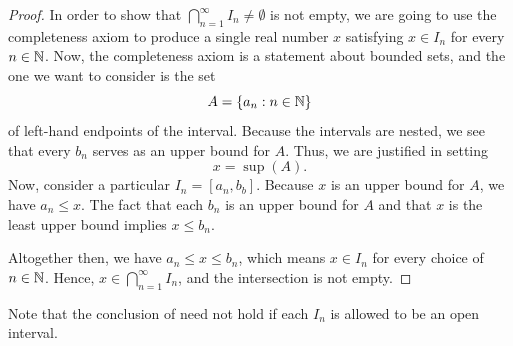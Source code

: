 \begin{proof}
  In order to show that $\bigcap_{n = 1}^{\infty} I_n \neq \emptyset$
  is not empty, we are going to use the completeness axiom to produce
  a single real number $x$ satisfying $x \in I_n$ for every $n \in
  \mathbb N$. Now, the completeness axiom is a statement about bounded
  sets, and the one we want to consider is the set
  \[ A = \{ a_n : n \in \mathbb N \} \]
  of left-hand endpoints of the interval. Because the intervals are
  nested, we see that every $b_n$ serves as an upper bound for $A$.
  Thus, we are justified in setting
  \[ x = \sup(A). \]
  Now, consider a particular $I_n = [a_n, b_b]$. Because $x$ is an
  upper bound for $A$, we have $a_n \leq x$. The fact that each $b_n$
  is an upper bound for $A$ and that $x$ is the least upper bound
  implies $x \leq b_n$.

  Altogether then, we have $a_n \leq x \leq b_n$, which means $x \in
  I_n$ for every choice of $n \in \mathbb N$. Hence, $x \in \bigcap_{n =
  1}^{\infty} I_n$, and the intersection is not empty.
\end{proof}

\begin{remark}
  Note that the conclusion of  need
  not hold if each $I_n$ is allowed to be an open interval.
\end{remark}
